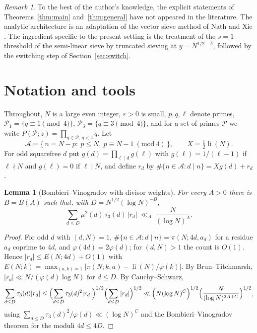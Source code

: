 \documentclass[11pt]{amsart}
\newtheorem{lemma}[theorem]{Lemma}
\theoremstyle{remark}
\newtheorem{remark}[theorem]{Remark}
\newcommand{\cA}{\mathcal{A}}
\newcommand{\cP}{\mathcal{P}}
\newcommand{\li}{\operatorname{li}}
\begin{document}
\begin{remark}
To the best of the author's knowledge, the explicit statements of Theorems~\ref{thm:main}
and~\ref{thm:general} have not appeared in the literature. The analytic architecture is an adaptation of the vector sieve method of Nath and Xie
\cite{NathXie}. The ingredient specific to the present setting is the treatment of the $s=1$ threshold of
the semi-linear sieve by truncated sieving at $y=N^{1/2-\delta}$, followed by the switching step of
Section~\ref{sec:switch}.
\end{remark}

\section{Notation and tools}

Throughout, $N$ is a large even integer, $\varepsilon>0$ is small, $p,q,\ell$ denote primes,
$\cP_1=\{q\equiv 1 \pmod 4\}$, $\cP_3=\{q\equiv 3\pmod 4\}$, and for a set of primes $\cP$ we write
$P(\cP;z)=\prod_{q\in\cP,\,q<z}q$. Let
\[
\cA=\{\,n=N-p:\ p\le N,\ p\equiv N-1 \ (\mathrm{mod}\ 4)\,\},\qquad X=\tfrac12\li(N).
\]
For odd squarefree $d$ put $g(d)=\prod_{\ell\mid d}g(\ell)$ with $g(\ell)=1/(\ell-1)$ if $\ell\nmid N$ and
$g(\ell)=0$ if $\ell\mid N$, and define $r_d$ by $\#\{n\in\cA: d\mid n\}=Xg(d)+r_d$.

\begin{lemma}[Bombieri--Vinogradov with divisor weights]\label{lem:BV}
For every $A>0$ there is $B=B(A)$ such that, with $D=N^{1/2}(\log N)^{-B}$,
\[
\sum_{d\le D}\mu^2(d)\,\tau_3(d)\,|r_d|\ \ll_A\ \frac{N}{(\log N)^A}.
\]
\end{lemma}

\begin{proof}
For odd $d$ with $(d,N)=1$, $\#\{n\in\cA:d\mid n\}=\pi(N;4d,a_d)$ for a residue $a_d$ coprime to $4d$, and
$\varphi(4d)=2\varphi(d)$; for $(d,N)>1$ the count is $O(1)$. Hence $|r_d|\le E(N;4d)+O(1)$ with
$E(N;k)=\max_{(a,k)=1}|\pi(N;k,a)-\li(N)/\varphi(k)|$. By Brun--Titchmarsh,
$|r_d|\ll N/(\varphi(d)\log N)$ for $d\le D$. By Cauchy--Schwarz,
\[
\sum_{d\le D}\tau_3(d)|r_d|\le\Bigl(\sum_{d\le D}\tau_3(d)^2|r_d|\Bigr)^{1/2}\Bigl(\sum_{d\le D}|r_d|\Bigr)^{1/2}
\ll \Bigl(N(\log N)^{C}\Bigr)^{1/2}\Bigl(\frac{N}{(\log N)^{2A+C}}\Bigr)^{1/2},
\]
using $\sum_{d\le D}\tau_3(d)^2/\varphi(d)\ll(\log N)^{C}$ and the Bombieri--Vinogradov theorem
\cite{Bombieri} for the moduli $4d\le 4D$.
\end{proof}
\end{document}
